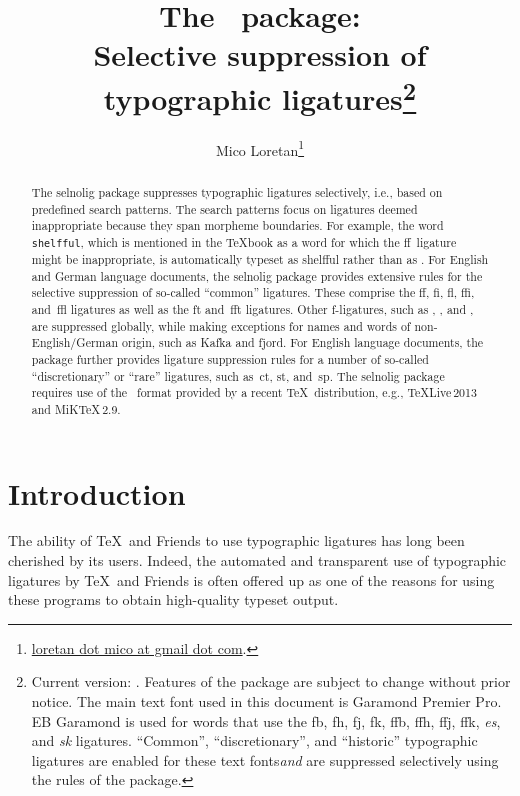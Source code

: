 \documentclass[11pt]{article}
\title{The \selnoligpackagename\ package: \\
Selective suppression of typographic ligatures\thanks{ 
Current version: \selnoligpackageversion. Features of the \pkg{selnolig} package are subject to change without prior notice. 
\newline\hspace*{\parindent}
The main text font used in this document is Garamond Premier Pro. {\ebg EB Garamond} is used for words that use the {\ebg fb, fh, fj, fk, ffb, ffh, ffj, ffk, \emph{es}, and \emph{sk}} ligatures. \enquote{Common}, \enquote{discretionary}, and \enquote{historic} typographic ligatures are enabled for these text fonts\textemdash \emph{and} are suppressed selectively using the rules of the \pkg{selnolig} package.} }
\author{Mico Loretan\thanks{
\href{mailto:loretan.mico@gmail.com}{loretan dot mico at gmail dot com}.}}
\date{\selnoligpackagedate}
\newcommand{\pkg}[1]{\textsf{#1}}
\newcommand{\opt}[1]{\texttt{#1}}
\begin{document}
\VerbatimFootnotes
{}

\selnoligoff
\maketitle
\selnoligon

\begin{abstract}

The \pkg{selnolig} package suppresses typographic ligatures selectively, i.e., based on predefined search patterns. The search patterns focus on ligatures deemed inappropriate because they span morpheme boundaries. For example, the word \opt{shelfful}, which is mentioned in the \TeX book as a word for which the ff~ligature might be inappropriate, is automatically typeset as shelfful rather than as .
\newline\hspace*{\parindent}
For English and German language documents, the \pkg{selnolig} package provides extensive rules for the selective suppression of so-called \enquote{common} ligatures. These comprise the ff, fi, fl, ffi, and~ffl ligatures as well as the ft and~fft ligatures. Other f-ligatures, such as {\ebg{}}, {\ebg{}}, {\ebg{}} and {\ebg{}}, are suppressed globally, while making exceptions for names and words of non-English/German origin, such as {\ebg Kafka} and {\ebg fjord}.
\newline\hspace*{\parindent}
For English language documents, the package further provides ligature suppression rules for a number of so-called \enquote{discretionary} or \enquote{rare} ligatures, such as~ct, st, and~sp.
\newline\hspace*{\parindent}
The \pkg{selnolig} package requires use of the \LuaLaTeX\ format provided by a recent \TeX\ distribution, e.g., \TeX Live\,2013 and MiK\TeX\,2.9.
\end{abstract}

\tableofcontents

\clearpage
{}

\section{Introduction}

The ability of \TeX\ and Friends to use typographic ligatures has long been cherished by its users. Indeed, the automated and transparent use of typographic ligatures by \TeX\ and Friends is often offered up as one of the reasons for using these programs to obtain high-quality typeset output.
\end{document}
